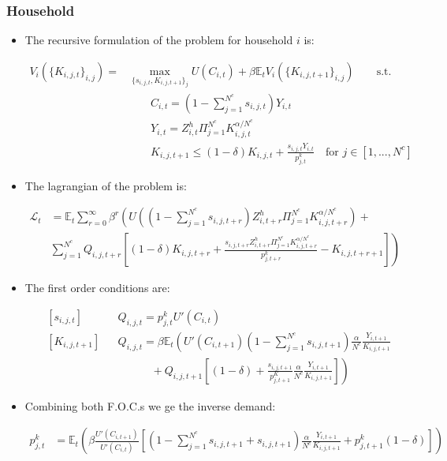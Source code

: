 \documentclass[11pt,english]{article}
\newcommand{\E}{\mathbb{E}}
\begin{document}
\subsubsection{Household}
\begin{itemize}
	
	\item The recursive formulation of the problem for household $i$ is:
	
	
	\begin{align*}
	V_i \left(\{K_{i,j,t}\}_{i,j}\right) = &\max_{\{s_{i,j,t},K_{i,j,t+1}\}_{j}}  U(C_{i,t}) + \beta \E_t V_i(\{K_{i,j,t+1}\}_{i,j}) \qquad \text{s.t.}\\
	&\qquad
	C_{i,t} = (1-\sum_{j=1}^{N^c} s_{i,j,t})Y_{i,t} \\
	&\qquad
	Y_{i,t}=Z^h_{i,t} \Pi_{j=1}^{N^c} K_{i,j,t}^{\alpha/N^c}\\
	&\qquad
	K_{i,j,t+1} \leq (1-\delta) K_{i,j,t} + \frac{s_{i,j,t} Y_{i,t}}{p^k_{j,t}}  \quad \text{for } j \in [1,...,N^c] 
	\end{align*}
	
	
	\item The lagrangian of the problem is: 
	
	\begin{align*}
	\mathcal{L}_{t} &= \E_t \sum_{r=0}^{\infty}\beta^r  \left( U\left( (1-\sum_{j=1}^{N^c} s_{i,j,t+r})Z^h_{i,t+r}\Pi_{j=1}^{N^c} K_{i,j,t+r}^{\alpha/N^c}  \right) + \right. \\
	& 	\left. \sum_{j=1}^{N^c}  Q_{i,j,t+r} \left[(1-\delta) K_{i,j,t+r} +\frac{s_{i,j,t+r}Z^h_{i,t+r} \Pi_{j=1}^{N^c} K_{i,j,t+r}^{\alpha/N^c}}{p^k_{j,t+r}} -K_{i,j,t+r+1}\right] \right)
	\end{align*}
	
	\item The first order conditions are:
	
	\begin{align*}
	& \left[s_{i,j,t}\right] && Q_{i,j,t}  =p^k_{j,t} U'(C_{i,t}) \\
	& \left[K_{i,j,t+1}\right] && Q_{i,j,t} = \beta \E_t \left(U'(C_{i,t+1}) (1-\sum_{j=1}^{N^c} s_{i,j,t+1}) \frac{\alpha}{N^c} \frac{Y_{i,t+1}}{K_{i,j,t+1}} \right. \\
	& && \left. \quad  \qquad + Q_{i,j,t+1} \left[ (1-\delta) + \frac{s_{i,j,t+1}}{p_{j,t+1}^K}  \frac{\alpha}{N^c} \frac{Y_{i,t+1}}{K_{i,j,t+1}} \right]  \right)
	\end{align*}
	
	\item Combining both F.O.C.s we ge the inverse demand:
	
	\begin{align}
	p^k_{j,t}  & =   \E_t \left( \beta \frac{U'(C_{i,t+1})}{U'(C_{i,t})} \left[ (1-\sum_{j=1}^{N^c} s_{i,j,t+1} + s_{i,j,t+1}) \frac{\alpha}{N^c} \frac{Y_{i,t+1}}{K_{i,j,t+1}} + p^k_{j,t+1} (1-\delta)  \right]  \right)
	\end{align}
	
\end{itemize}
\end{document}
